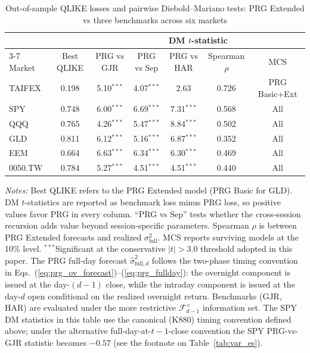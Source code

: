\documentclass[11pt,a4paper]{article}
\begin{document}
\begin{table}[htbp]
\centering
\caption{Out-of-sample QLIKE losses and pairwise Diebold--Mariano tests: PRG Extended vs three benchmarks across six markets}
\label{tab:main_results}
\small
\begin{tabular}{lcccccc}
\toprule
 & & \multicolumn{5}{c}{DM $t$-statistic} \\
\cmidrule(lr){3-7}
Market & Best QLIKE & PRG vs GJR & PRG vs Sep & PRG vs HAR & Spearman $\rho$ & MCS \\
\midrule
TAIFEX  & 0.198 & 5.10$^{***}$ & 4.07$^{***}$ & 2.63 & 0.726 & PRG Basic+Ext \\
SPY     & 0.748 & 6.00$^{***}$ & 6.69$^{***}$ & 7.31$^{***}$ & 0.568 & All \\
QQQ     & 0.765 & 4.26$^{***}$ & 5.47$^{***}$ & 8.84$^{***}$ & 0.502 & All \\
GLD     & 0.811 & 6.12$^{***}$ & 5.16$^{***}$ & 6.87$^{***}$ & 0.352 & All \\
EEM     & 0.664 & 6.63$^{***}$ & 6.34$^{***}$ & 6.30$^{***}$ & 0.469 & All \\
0050.TW & 0.784 & 5.27$^{***}$ & 4.51$^{***}$ & 4.51$^{***}$ & 0.440 & All \\
\bottomrule
\end{tabular}
\begin{flushleft}
\footnotesize
\emph{Notes:} Best QLIKE refers to the PRG Extended model (PRG Basic for GLD). DM $t$-statistics are reported as benchmark loss minus PRG loss, so positive values favor PRG in every column. ``PRG vs Sep'' tests whether the cross-session recursion adds value beyond session-specific parameters. Spearman $\rho$ is between PRG Extended forecasts and realized $\sigma^2_{\text{full}}$. MCS reports surviving models at the 10\% level. $^{***}$Significant at the conservative $|t| > 3.0$ threshold adopted in this paper. The PRG full-day forecast $\hat{\sigma}^2_{\text{full},d}$ follows the two-phase timing convention in Eqs.~(\ref{eq:prg_ov_forecast})--(\ref{eq:prg_fullday}): the overnight component is issued at the day-$(d-1)$ close, while the intraday component is issued at the day-$d$ open conditional on the realized overnight return. Benchmarks (GJR, HAR) are evaluated under the more restrictive $\mathcal{F}_{d-1}^{\,c}$ information set. The SPY DM statistics in this table use the canonical (K880) timing convention defined above; under the alternative full-day-at-$t\!-\!1$-close convention the SPY PRG-vs-GJR statistic becomes $-0.57$ (see the footnote on Table~\ref{tab:var_es}).
\end{flushleft}
\end{table}
\end{document}
